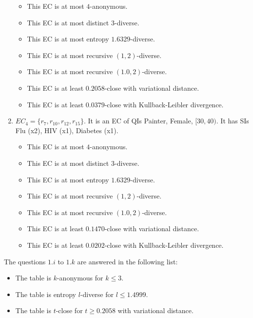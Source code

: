 \documentclass[12pt,reqno]{amsart}
\begin{document}
\begin{enumerate}
  \begin{itemize}
 	\item This EC is at most $4$-anonymous.
 	\item This EC is at most distinct $3$-diverse.
 	\item This EC is at most entropy $1.6329$-diverse.
 	\item This EC is at most recursive $(1,2)$-diverse.
 	\item This EC is at most recursive $(1.0,2)$-diverse.
 	\item This EC is at least $0.2058$-close with variational distance.
 	\item This EC is at least $0.0379$-close with Kullback-Leibler divergence.
 \end{itemize}
 \item $EC_4 = \{r_7, r_{10}, r_{12}, r_{15}\}$. It is an EC of QIs Painter, Female, $[30, 40)$.  It has SIs Flu (x2), HIV (x1), Diabetes (x1).
  \begin{itemize}
 	\item This EC is at most $4$-anonymous.
 	\item This EC is at most distinct $3$-diverse.
 	\item This EC is at most entropy $1.6329$-diverse.
 	\item This EC is at most recursive $(1,2)$-diverse.
 	\item This EC is at most recursive $(1.0,2)$-diverse.
 	\item This EC is at least $0.1470$-close with variational distance.
 	\item This EC is at least $0.0202$-close with Kullback-Leibler divergence.
 \end{itemize}
\end{enumerate}
The questions $1.i$ to $1.k$ are answered in the following list:
 \begin{itemize}
 	\item The table is $k$-anonymous for $k \leq 3$.
 	\item The table is entropy $l$-diverse for $l \leq 1.4999$.
 	\item The table is $t$-close for $t \geq 0.2058$ with variational distance.
 \end{itemize}
\end{document}

